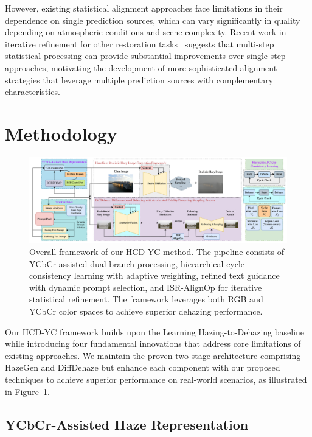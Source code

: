 \documentclass{article}
\begin{document}
However, existing statistical alignment approaches face limitations in their dependence on single prediction sources, which can vary significantly in quality depending on atmospheric conditions and scene complexity. Recent work in iterative refinement for other restoration tasks~\cite{zhang2023iterative} suggests that multi-step statistical processing can provide substantial improvements over single-step approaches, motivating the development of more sophisticated alignment strategies that leverage multiple prediction sources with complementary characteristics.

\section{Methodology}

\begin{figure}[t]
\centering
\includegraphics[width=\textwidth]{flowchart.jpg}
\caption{Overall framework of our HCD-YC method. The pipeline consists of YCbCr-assisted dual-branch processing, hierarchical cycle-consistency learning with adaptive weighting, refined text guidance with dynamic prompt selection, and ISR-AlignOp for iterative statistical refinement. The framework leverages both RGB and YCbCr color spaces to achieve superior dehazing performance.}
\label{fig:framework}
\end{figure}

Our HCD-YC framework builds upon the Learning Hazing-to-Dehazing baseline while introducing four fundamental innovations that address core limitations of existing approaches. We maintain the proven two-stage architecture comprising HazeGen and DiffDehaze but enhance each component with our proposed techniques to achieve superior performance on real-world scenarios, as illustrated in Figure~\ref{fig:framework}.

\subsection{YCbCr-Assisted Haze Representation}
\end{document}
